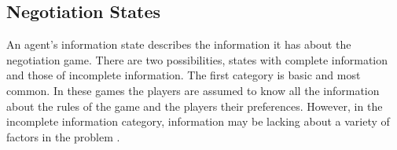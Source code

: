 











\subsection{Negotiation States}
An agent’s information state describes the information it has about the negotiation game. There are two possibilities, states with complete information and those of incomplete information. The first category is basic and most common. In these games the players are assumed to know all the information about the rules of the game and the players their preferences. However, in the incomplete information category, information may be lacking about a variety of factors in the problem \citep{fatima2004agenda}. %


